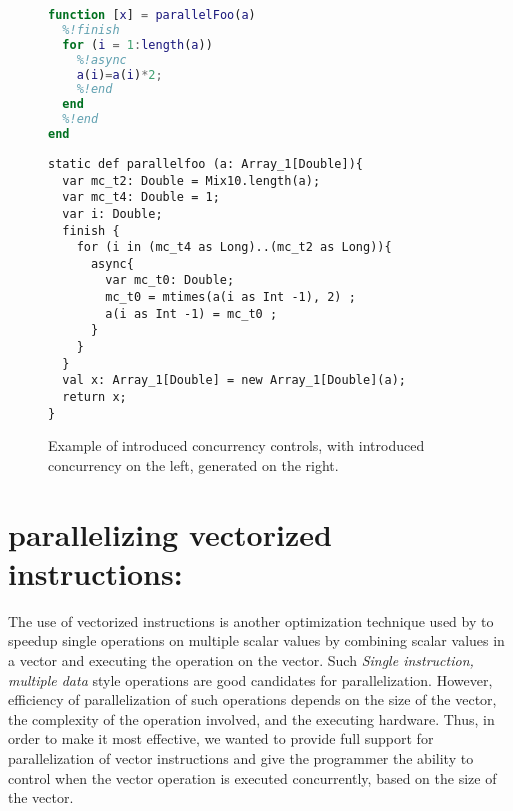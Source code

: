 \begin{figure}[htbp]
\begin{minipage}{0.4\linewidth}

\begin{lstlisting}[language=Matlab,numbers=none]       
function [x] = parallelFoo(a)    
  %!finish
  for (i = 1:length(a))
    %!async
    a(i)=a(i)*2;
    %!end	
  end
  %!end
end                                                                             
\end{lstlisting}

\end{minipage}\hfill
\begin{minipage}{0.6\linewidth}
\begin{lstlisting}[language=X10,numbers=none]                                   
static def parallelfoo (a: Array_1[Double]){
  var mc_t2: Double = Mix10.length(a);
  var mc_t4: Double = 1;
  var i: Double;
  finish {
    for (i in (mc_t4 as Long)..(mc_t2 as Long)){
      async{
        var mc_t0: Double;
        mc_t0 = mtimes(a(i as Int -1), 2) ;
        a(i as Int -1) = mc_t0 ;
      }
    }
  }
  val x: Array_1[Double] = new Array_1[Double](a);
  return x;
}
\end{lstlisting}
\end{minipage}

\caption{Example of introduced concurrency controls, \matlab with
introduced concurrency on the left, generated \xten on the right.}\label{fig:concex}
\end{figure}

\section{parallelizing vectorized instructions:} 
The use of vectorized instructions is another optimization technique
used by \matlab to speedup single operations on multiple scalar values by
combining scalar values in a vector and executing the operation on the
vector.  Such \emph{Single instruction, multiple data} style operations
are good candidates for parallelization. However, efficiency of
parallelization of such operations depends on the size of the vector,
the complexity of the operation involved, and the executing hardware. Thus,
in order to make it most effective, we wanted to provide full support
for parallelization of vector instructions and give the programmer the
ability to control when the vector operation is executed concurrently,
based on the size of the vector. 

